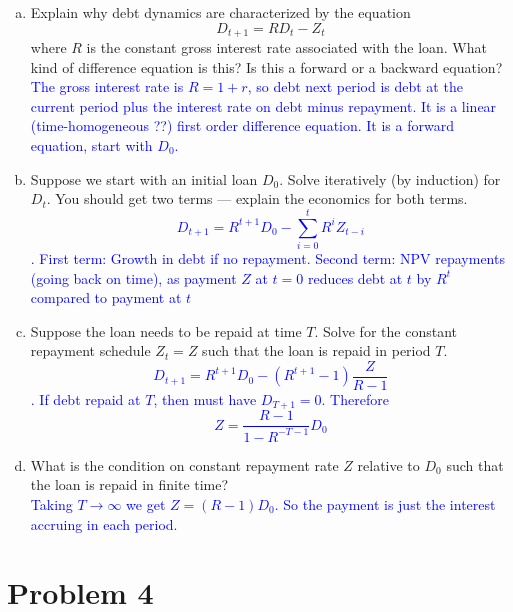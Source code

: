\documentclass[11pt]{extarticle}
\theoremstyle{plain}
\theoremstyle{definition}
\begin{document}
\begin{enumerate}[(a)]
\item Explain why debt dynamics are characterized by the equation
\begin{equation*}
	D_{t+1} = RD_t - Z_t
\end{equation*}
where $R$ is the constant gross interest rate associated with the loan. What kind of difference equation is this? Is this a forward or a backward equation? \\
\textcolor{blue}{The gross interest rate is $R=1+r$, so debt next period is debt at the current period plus the interest rate on debt minus repayment. It is a linear (time-homogeneous ??) first order difference equation. It is a forward equation, start with $D_0$.}

\item Suppose we start with an initial loan $D_0$. Solve iteratively (by induction) for $D_t$. You should get two terms --- explain the economics for both terms.\\
\textcolor{blue}{$$D_{t+1}=R^{t+1} D_0-\sum_{i=0}^t R^i Z_{t-i}$$. First term: Growth in debt if no repayment. Second term: NPV repayments (going back on time), as payment $Z$ at $t=0$ reduces debt at $t$ by $R^t$ compared to payment at $t$ }

\item Suppose the loan needs to be repaid at time $T$. Solve for the constant repayment schedule $Z_t = Z$ such that the loan is repaid in period $T$.\\
\textcolor{blue}{$$D_{t+1}=R^{t+1} D_0-\left(R^{t+1}-1\right) \frac{Z}{R-1}$$. If debt repaid at $T$, then must have $D_{T+1}=0$. Therefore $$Z=\frac{R-1}{1-R^{-T-1}}D_0$$}
\item What is the condition on constant repayment rate $Z$ relative to $D_0$ such that the loan is repaid in finite time? \\
\textcolor{blue}{Taking $T\rightarrow \infty$ we get $Z=(R-1)D_0$. So the payment is just the interest accruing in each period.}
\end{enumerate}



\vspace{10mm}
\section*{Problem 4}
\end{document}
